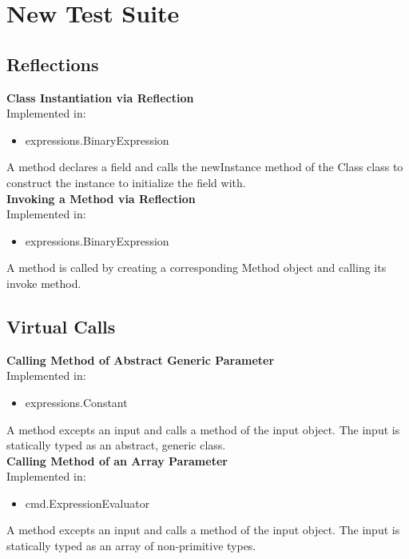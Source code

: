 \documentclass{article}
\begin{document}
\section{New Test Suite}\label{sec:newtestsuite}

\subsection{Reflections}

\textbf{Class Instantiation via Reflection}\\
Implemented in: 
\begin{itemize}
    \item expressions.BinaryExpression
\end{itemize}
A method declares a field and calls the newInstance method of the Class class to construct the instance to initialize the field with.\\

\noindent
\textbf{Invoking a Method via Reflection}\\
Implemented in: 
\begin{itemize}
    \item expressions.BinaryExpression
\end{itemize}
A method is called by creating a corresponding Method object and calling its invoke method.\\

\subsection{Virtual Calls}

\textbf{Calling Method of Abstract Generic Parameter}\\
Implemented in: 
\begin{itemize}
    \item expressions.Constant
\end{itemize}
A method excepts an input and calls a method of the input object. The input is statically typed as an abstract, generic class.\\

\noindent
\textbf{Calling Method of an Array Parameter}\\
Implemented in: 
\begin{itemize}
    \item cmd.ExpressionEvaluator
\end{itemize}
A method excepts an input and calls a method of the input object. The input is statically typed as an array of non-primitive types.\\
\end{document}
